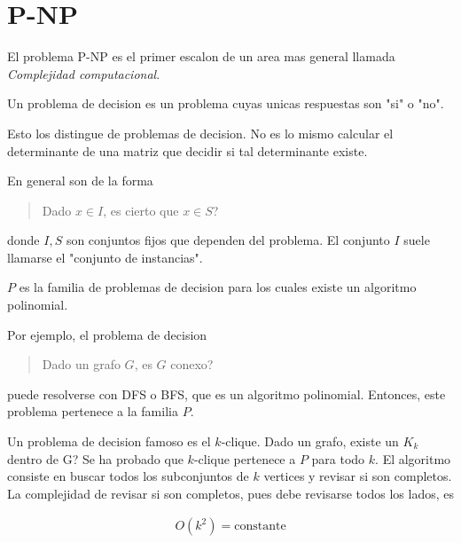 \documentclass[a4paper]{article}
\begin{document}
\pagebreak

\section{P-NP}

El problema P-NP es el primer escalon de un area mas general llamada 
\textit{Complejidad computacional}.

\begin{definition}
    Un problema de decision es un problema cuyas unicas respuestas
    son "si" o "no".
\end{definition}

Esto los distingue de problemas de decision. No es lo mismo calcular el
determinante de una matriz que decidir si tal determinante existe. 

En general son de la forma 


\small
\begin{quote}

Dado $x \in I$, es cierto que $x \in S$?

\end{quote}
\normalsize

donde $I, S$ son conjuntos fijos que dependen del problema. El conjunto
$I$ suele llamarse el "conjunto de instancias".

\begin{definition}
    $P$ es la familia de problemas de decision para los cuales 
    existe un algoritmo polinomial.
\end{definition}

Por ejemplo, el problema de decision


\small
\begin{quote}

Dado un grafo $G$, es $G$ conexo?

\end{quote}
\normalsize

puede resolverse con DFS o BFS, que es un algoritmo polinomial. Entonces, 
este problema pertenece a la familia $P$.


Un problema de decision famoso es el $k$-clique. Dado un grafo, existe un $K_k$
dentro de G? Se ha probado que $k$-clique pertenece a $P$ para todo $k$. El
algoritmo consiste en buscar todos los subconjuntos de $k$ vertices y revisar
si son completos. La complejidad de revisar si son completos, pues debe revisarse todos 
los lados, es 

\begin{align*}
    O(k^2) = \text{constante}
\end{align*}
\end{document}

